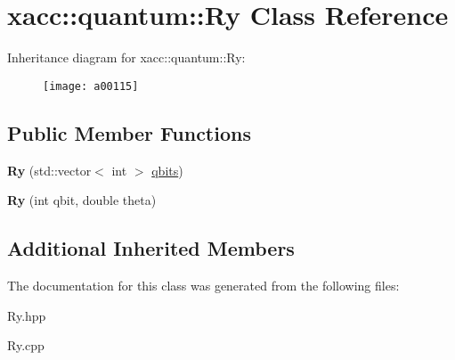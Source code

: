\hypertarget{a00115}{}\section{xacc\+:\+:quantum\+:\+:Ry Class Reference}
\label{a00115}
Inheritance diagram for xacc\+:\+:quantum\+:\+:Ry\+:\begin{figure}[H]
\begin{center}
\leavevmode
\texttt{[image: a00115]}
\end{center}
\end{figure}
\subsection*{Public Member Functions}
\begin{DoxyCompactItemize}
\item 
{\bfseries Ry} (std\+::vector$<$ int $>$ \hyperlink{a00062_a2a56be6c2519ea65df4d06f4abae1393}{qbits})\hypertarget{a00115_a542e1c0576a8e784f6cece4c77598486}{}\label{a00115_a542e1c0576a8e784f6cece4c77598486}

\item 
{\bfseries Ry} (int qbit, double theta)\hypertarget{a00115_a1cb81fe622168ba8d79fa2a78b5b0006}{}\label{a00115_a1cb81fe622168ba8d79fa2a78b5b0006}

\end{DoxyCompactItemize}
\subsection*{Additional Inherited Members}


The documentation for this class was generated from the following files\+:\begin{DoxyCompactItemize}
\item 
Ry.\+hpp\item 
Ry.\+cpp\end{DoxyCompactItemize}
